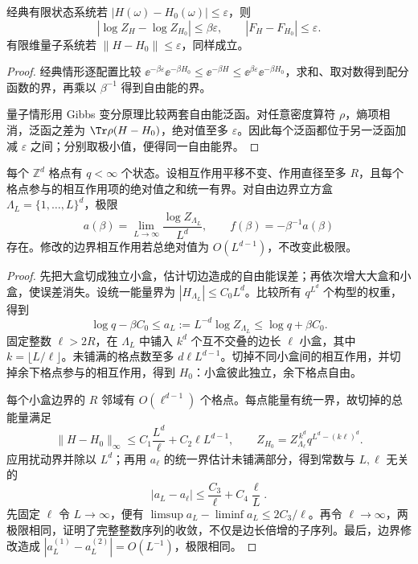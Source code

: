 \begin{lemma}[有限系统自由能的扰动界]
经典有限状态系统若 $|H(\omega)-H_0(\omega)|\le\varepsilon$，则
\[
 |\log Z_H-\log Z_{H_0}|\le\beta\varepsilon,
 \qquad |F_H-F_{H_0}|\le\varepsilon.
\]
有限维量子系统若 $\|H-H_0\|\le\varepsilon$，同样成立。
\end{lemma}
\begin{proof}
经典情形逐配置比较 $\ee^{-\beta\varepsilon}\ee^{-\beta H_0}\le \ee^{-\beta H}\le \ee^{\beta\varepsilon}\ee^{-\beta H_0}$，求和、取对数得到配分函数的界，再乘以 $\beta^{-1}$ 得到自由能的界。

量子情形用 Gibbs 变分原理比较两套自由能泛函。对任意密度算符 $\rho$，熵项相消，泛函之差为 $\Tr\rho(H-H_0)$，绝对值至多 $\varepsilon$。因此每个泛函都位于另一泛函加减 $\varepsilon$ 之间；分别取极小值，便得同一自由能界。
\end{proof}

\begin{theorem}[有限程格点模型的体自由能极限]
每个 $\mathbb Z^d$ 格点有 $q<\infty$ 个状态。设相互作用平移不变、作用直径至多 $R$，且每个格点参与的相互作用项的绝对值之和统一有界。对自由边界立方盒 $\Lambda_L=\{1,\ldots,L\}^d$，极限
\[
 a(\beta)=\lim_{L\to\infty}\frac{\log Z_{\Lambda_L}}{L^d},
 \qquad f(\beta)=-\beta^{-1}a(\beta)
\]
存在。修改的边界相互作用若总绝对值为 $O(L^{d-1})$，不改变此极限。
\end{theorem}
\begin{proof}
先把大盒切成独立小盒，估计切边造成的自由能误差；再依次增大大盒和小盒，使误差消失。设统一能量界为 $|H_{\Lambda_L}|\le C_0L^d$。比较所有 $q^{L^d}$ 个构型的权重，得到
\[
 \log q-\beta C_0\le a_L:=L^{-d}\log Z_{\Lambda_L}
 \le\log q+\beta C_0.
\]
固定整数 $\ell>2R$，在 $\Lambda_L$ 中铺入 $k^d$ 个互不交叠的边长 $\ell$ 小盒，其中 $k=\lfloor L/\ell\rfloor$。未铺满的格点数至多 $d\ell L^{d-1}$。切掉不同小盒间的相互作用，并切掉余下格点参与的相互作用，得到 $H_0$：小盒彼此独立，余下格点自由。

每个小盒边界的 $R$ 邻域有 $O(\ell^{d-1})$ 个格点。每点能量有统一界，故切掉的总能量满足
\[
 \|H-H_0\|_\infty\le C_1\frac{L^d}{\ell}+C_2\ell L^{d-1},
 \qquad Z_{H_0}=Z_{\Lambda_\ell}^{\,k^d}q^{L^d-(k\ell)^d}.
\]
应用扰动界并除以 $L^d$；再用 $a_\ell$ 的统一界估计未铺满部分，得到常数与 $L,\ell$ 无关的
\begin{equation}
 |a_L-a_\ell|\le\frac{C_3}{\ell}+C_4\frac{\ell}{L}.
 \label{eq:phys-sm-subadditivity-free-energy}
\end{equation}
先固定 $\ell$ 令 $L\to\infty$，便有 $\limsup a_L-\liminf a_L\le2C_3/\ell$。再令 $\ell\to\infty$，两极限相同，证明了完整整数序列的收敛，不仅是边长倍增的子序列。最后，边界修改造成 $|a_L^{(1)}-a_L^{(2)}|=O(L^{-1})$，极限相同。
\end{proof}

